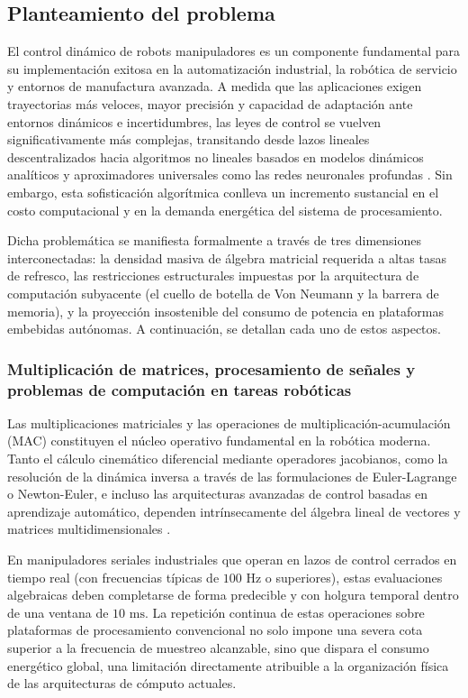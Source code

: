 \documentclass[12pt]{article}
\begin{document}
\subsection*{Planteamiento del problema}
El control dinámico de robots manipuladores es un componente fundamental para su implementación exitosa en la automatización industrial, la robótica de servicio y entornos de manufactura avanzada. A medida que las aplicaciones exigen trayectorias más veloces, mayor precisión y capacidad de adaptación ante entornos dinámicos e incertidumbres, las leyes de control se vuelven significativamente más complejas, transitando desde lazos lineales descentralizados hacia algoritmos no lineales basados en modelos dinámicos analíticos y aproximadores universales como las redes neuronales profundas \cite{JuarezLora2024Thesis, Park2025electronics}. Sin embargo, esta sofisticación algorítmica conlleva un incremento sustancial en el costo computacional y en la demanda energética del sistema de procesamiento.

Dicha problemática se manifiesta formalmente a través de tres dimensiones interconectadas: la densidad masiva de álgebra matricial requerida a altas tasas de refresco, las restricciones estructurales impuestas por la arquitectura de computación subyacente (el cuello de botella de Von Neumann y la barrera de memoria), y la proyección insostenible del consumo de potencia en plataformas embebidas autónomas. A continuación, se detallan cada uno de estos aspectos.

\subsubsection*{Multiplicación de matrices, procesamiento de señales y problemas de computación en tareas robóticas}
Las multiplicaciones matriciales y las operaciones de multiplicación-acumulación (MAC) constituyen el núcleo operativo fundamental en la robótica moderna. Tanto el cálculo cinemático diferencial mediante operadores jacobianos, como la resolución de la dinámica inversa a través de las formulaciones de Euler-Lagrange o Newton-Euler, e incluso las arquitecturas avanzadas de control basadas en aprendizaje automático, dependen intrínsecamente del álgebra lineal de vectores y matrices multidimensionales \cite{Chen2021memristor, modern_robotics}.

En manipuladores seriales industriales que operan en lazos de control cerrados en tiempo real (con frecuencias típicas de $100\text{ Hz}$ o superiores), estas evaluaciones algebraicas deben completarse de forma predecible y con holgura temporal dentro de una ventana de $10\text{ ms}$. La repetición continua de estas operaciones sobre plataformas de procesamiento convencional no solo impone una severa cota superior a la frecuencia de muestreo alcanzable, sino que dispara el consumo energético global, una limitación directamente atribuible a la organización física de las arquitecturas de cómputo actuales.
\end{document}
